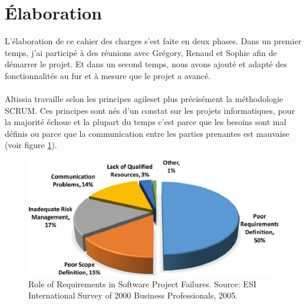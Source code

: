 \section{Élaboration}
\label{sec:elaboration}

L'élaboration de ce cahier des charges s'est faite en deux phases. 
Dans un premier temps, j'ai participé à des réunions avec Grégory, Renaud et Sophie afin de démarrer le projet. 
Et dans un second temps, nous avons ajouté et adapté des fonctionnalités au fur et à mesure que le projet a avancé.

\paragraph{}
Altissia travaille selon les principes agiles\fnmark et plus précisément la méthodologie SCRUM\fnmark.
Ces principes sont nés d'un constat sur les projets informatiques, pour la majorité échoue\cite{standish_standish_nodate} et la plupart du temps c'est parce que les besoins sont mal définis ou parce que la communication entre les parties prenantes est mauvaise (voir figure \ref{fig:why-projects-fails}).

\begin{figure}[ht]
    \centering
    \includegraphics[scale=.8]{images/why-projects-fail.png}
    \caption{Role of Requirements in Software Project Failures. Source: ESI International Survey of 2000 Business Professionals, 2005.}
    \label{fig:why-projects-fails}
\end{figure}


